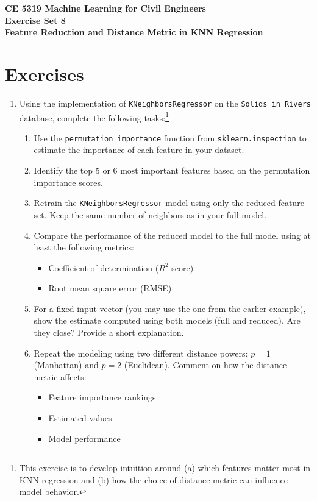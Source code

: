 \documentclass[12pt]{article}
\begin{document}
\begin{center}
{\textbf{{ CE 5319 Machine Learning for Civil Engineers} \\ {Exercise Set 8} \\ {Feature Reduction and Distance Metric in KNN Regression} }}
\end{center}

\section*{\small{Exercises}}
\begin{enumerate}
\item Using the implementation of \texttt{KNeighborsRegressor} on the \texttt{Solids\_in\_Rivers} database, complete the following tasks:\footnote{This exercise is to develop intuition around (a) which features matter most in KNN regression and (b) how the choice of distance metric can influence model behavior.}

\begin{enumerate}
    \item Use the \texttt{permutation\_importance} function from \texttt{sklearn.inspection} to estimate the importance of each feature in your dataset.
    \item Identify the top 5 or 6 most important features based on the permutation importance scores.
    \item Retrain the \texttt{KNeighborsRegressor} model using only the reduced feature set. Keep the same number of neighbors as in your full model.
    \item Compare the performance of the reduced model to the full model using at least the following metrics:
    \begin{itemize}
        \item Coefficient of determination ($R^2$ score)
        \item Root mean square error (RMSE)
    \end{itemize}
    \item For a fixed input vector (you may use the one from the earlier example), show the estimate computed using both models (full and reduced). Are they close? Provide a short explanation.
    \item Repeat the modeling using two different distance powers: $p=1$ (Manhattan) and $p=2$ (Euclidean). Comment on how the distance metric affects:
    \begin{itemize}
        \item Feature importance rankings
        \item Estimated values
        \item Model performance
    \end{itemize}
\end{enumerate}




\end{enumerate}
\end{document}
